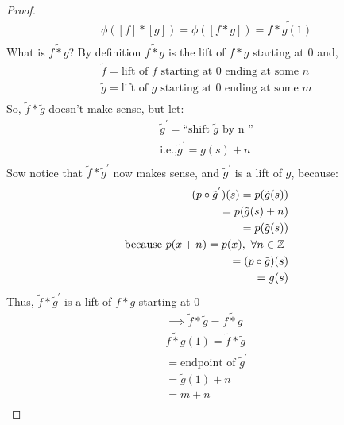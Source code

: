 \begin{enumerate}
\begin{proof}
\begin{align*}
                    \phi([f]*[g])=\phi([f*g])=\tilde{f*g(1)}\\
                \end{align*}
                What is $\tilde{f*g}$? By definition $\tilde{f*g}$ is the lift of $f*g$
                starting at $0$ and,
                \begin{align*}
                    \tilde{f}=\text{lift of $f$ starting at 0 ending at some $n$}\\
                    \tilde{g}=\text{lift of $g$ starting at 0 ending at some $m$}\\
                \end{align*}
                So, $\tilde{f}*\tilde{g}$ doesn't make sense, but let:
                \begin{align*}
                    \tilde{g}^{'}=\text{``shift $\tilde{g}$ by n ''}\\
                    \text{i.e.,}\tilde{g}^{'}=g(s)+n\\
                \end{align*}
                Sow notice that $\tilde{f}*\tilde{g}^{'}$ now makes sense, and $\tilde{g}^{'}$ is a
                lift of $g$, because:
                \begin{align*}
                    (p\circ\tilde{g}^{'})(s)=p(\tilde{g}(s))\\
                    =p(\tilde{g}(s)+n)\\
                    =p(\tilde{g}(s))\\
                    \text{because $p(x+n)=p(x),\ \forall n\in\mathbb{Z}$ }\\
                    =(p\circ\tilde{g})(s)\\
                    =g(s)\\
                \end{align*}
                Thus, $\tilde{f}*\tilde{g}^{'}$ is a lift of $f*g$ starting at $0$\\
                \begin{align*}
                    \implies \tilde{f}*\tilde{g}=\tilde{f*g}\\
                    \tilde{f*g}(1)=\tilde{f}*\tilde{g}\\
                    =\text{endpoint of $\tilde{g}^{'}$}\\
                    =\tilde{g}(1)+n\\
                    =m+n\\
                \end{align*}

\end{proof}
\end{enumerate}
